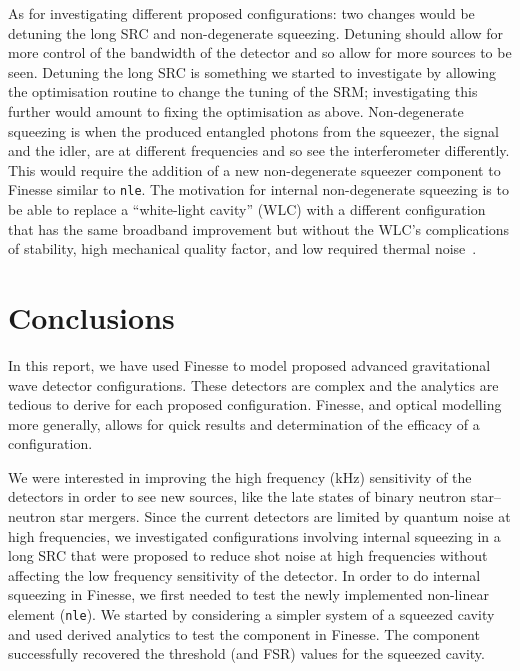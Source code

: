 \documentclass[aps,pra,superscriptaddress,reprint,nofootinbib]{revtex4-1}
\newcommand{\code}[1]{\texttt{#1}}
\begin{document}
As for investigating different proposed configurations: two changes would be detuning the long SRC and non-degenerate squeezing. Detuning should allow for more control of the bandwidth of the detector and so allow for more sources to be seen.
Detuning the long SRC is something we started to investigate by allowing the optimisation routine to change the tuning of the SRM; investigating this further would amount to fixing the optimisation as above.
Non-degenerate squeezing is when the produced entangled photons from the squeezer, the signal and the idler, are at different frequencies and so see the interferometer differently. This would require the addition of a new non-degenerate squeezer component to Finesse similar to \code{nle}. The motivation for internal non-degenerate squeezing is to be able to replace a ``white-light cavity'' (WLC) with a different configuration that has the same broadband improvement but without the WLC’s complications of stability, high mechanical quality factor, and low required thermal noise~\cite{white-light-resonators}.




\section{Conclusions}
\label{sec:conclusions}

In this report, we have used Finesse to model proposed advanced gravitational wave detector configurations. These detectors are complex and the analytics are tedious to derive for each proposed configuration. Finesse, and optical modelling more generally, allows for quick results and determination of the efficacy of a configuration.


We were interested in improving the high frequency (kHz) sensitivity of the detectors in order to see new sources, like the late states of binary neutron star--neutron star mergers. Since the current detectors are limited by quantum noise at high frequencies, we investigated configurations involving internal squeezing in a long SRC that were proposed to reduce shot noise at high frequencies without affecting the low frequency sensitivity of the detector. In order to do internal squeezing in Finesse, we first needed to test the newly implemented non-linear element (\code{nle}). We started by considering a simpler system of a squeezed cavity and used derived analytics to test the component in Finesse. The component successfully recovered the threshold (and FSR) values for the squeezed cavity.
\end{document}
